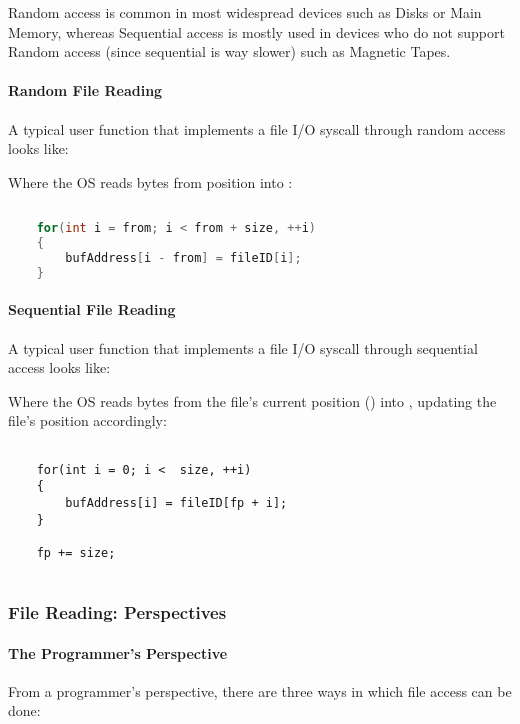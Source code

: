 \documentclass[openright, twoside]{report}
\theoremstyle{definition}
\theoremstyle{example}
\begin{document}
Random access is common in most widespread devices such as Disks or Main Memory, whereas 
Sequential access is mostly used in devices who do not support Random access   
(since sequential is way slower) such as Magnetic Tapes.

\paragraph{Random File Reading}
A typical user function that implements a file I/O syscall through random access looks like: 

\begin{center}
\end{center}

Where the OS reads  bytes from position  into :

\begin{lstlisting}[language = C++]
	
	for(int i = from; i < from + size, ++i) 
	{
		bufAddress[i - from] = fileID[i];
	}

\end{lstlisting}

\paragraph{Sequential File Reading}
A typical user function that implements a file I/O syscall through sequential access looks like: 

\begin{center}
\end{center}

Where the OS reads  bytes from the file's current position () into , 
updating the file's position accordingly:


\begin{lstlisting}
	
	for(int i = 0; i <  size, ++i)
	{
		bufAddress[i] = fileID[fp + i];
	}

	fp += size;
	
\end{lstlisting}

\subsubsection{File Reading: Perspectives}

\paragraph{The Programmer's Perspective}
From a programmer's perspective, there are three 
ways in which file access can be done:
\end{document}
